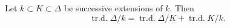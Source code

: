 Let $k \subset K \subset \Delta$ be successive extensions of $k$. Then
$$\operatorname{tr.d.} \Delta/k = \operatorname{tr.d.} \Delta/K + \operatorname{tr.d.} K/k.$$
